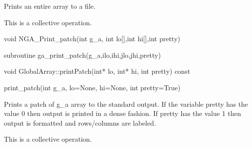 \documentclass[12pt]{article}
\begin{document}
\begin{desc}

Prints an entire array to a file.

This is a collective operation.
\end{desc}


\begin{capi}
\begin{ccode}
void NGA_Print_patch(int g_a, int lo[],int hi[],int pretty)
\end{ccode}
\begin{funcargs}
\end{funcargs}
\end{capi}

\begin{f2dapi}
\begin{fcode}
subroutine ga_print_patch(g_a,ilo,ihi,jlo,jhi,pretty)   
\end{fcode}
\begin{funcargs}
\end{funcargs}
\end{f2dapi}

\begin{cxxapi}
\begin{cxxcode}
void GlobalArray::printPatch(int* lo, int* hi, int pretty) const
\end{cxxcode}
\begin{funcargs}
\end{funcargs}
\end{cxxapi}

\begin{pyapi}
\begin{pycode}
print_patch(int g_a, lo=None, hi=None, int pretty=True)
\end{pycode}
\end{pyapi}

\begin{desc}

Prints a patch of g_a array to the standard output. If the variable 
pretty has the value 0 then output is printed in a dense fashion. If 
pretty has the value 1 then output is formatted and rows/columns are labeled.

This is a collective operation.
\end{desc}
\end{document}
